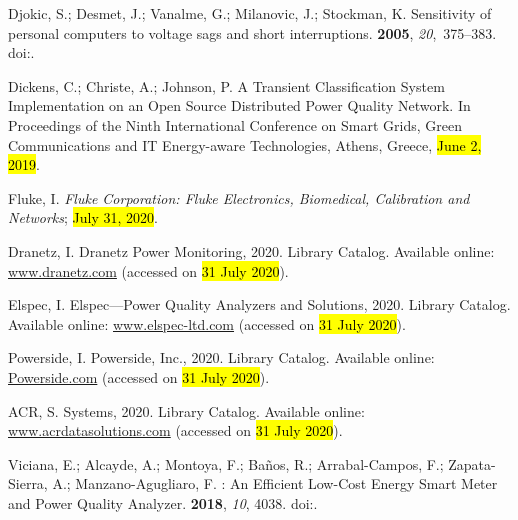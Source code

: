 \documentclass[energies,article,accept,moreauthors,pdftex]{Definitions/mdpi}
\begin{document}
\begin{thebibliography}{999}
Djokic, S.; Desmet, J.; Vanalme, G.; Milanovic, J.; Stockman, K.
\newblock Sensitivity of personal computers to voltage sags and short
interruptions.
 {\bf 2005}, {\em
20},~375--383.
\newblock
doi:{\href{https://doi.org/10.1109/TPWRD.2004.837828}{}}.

Dickens, C.; Christe, A.; Johnson, P.
\newblock A {Transient} {Classification} {System} {Implementation} on an {Open}
{Source} {Distributed} {Power} {Quality} {Network}.
\newblock  In Proceedings of the {Ninth} {International} {Conference} on {Smart}
{Grids}, {Green} {Communications} and {IT} {Energy}-aware {Technologies}, Athens, Greece,
\hl{June 2, 2019}.

Fluke, I.
\newblock \emph{Fluke {Corporation}: {Fluke} {Electronics}, {Biomedical},
{Calibration} and {Networks}}; \hl{July 31, 2020}.

Dranetz, I.
\newblock Dranetz {Power} {Monitoring}, 2020.
\newblock Library Catalog. Available online:  \url{ www.dranetz.com} (accessed on \hl{31 July 2020}).

Elspec, I.
\newblock Elspec---{Power} Quality Analyzers and Solutions, 2020.
\newblock Library Catalog. Available online:  \url{www.elspec-ltd.com} (accessed on \hl{31 July 2020}).

Powerside, I.
\newblock Powerside, {Inc}., 2020.
\newblock Library Catalog. Available online:  \url{Powerside.com}  (accessed on \hl{31 July 2020}).

ACR, S.
 {Systems}, 2020.
\newblock Library Catalog. Available online:  \url{www.acrdatasolutions.com}  (accessed on \hl{31 July 2020}).

Viciana, E.; Alcayde, A.; Montoya, F.; Baños, R.; Arrabal-Campos, F.;
Zapata-Sierra, A.; Manzano-Agugliaro, F.
: {An} {Efficient} {Low}-{Cost} {Energy} {Smart} {Meter}
and {Power} {Quality} {Analyzer}.
 {\bf 2018}, {\em 10}, 4038.
\newblock
doi:{\href{https://doi.org/10.3390/su10114038}{}}.


\end{thebibliography}
\end{document}
